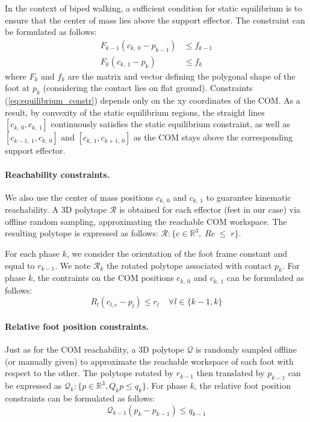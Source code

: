 In the context of biped walking, a sufficient condition for static equilibrium is to ensure that the center of mass lies above the support effector.
The constraint can be formulated as follows:
\begin{equation}
    \label{eq:equilibrium_constr}
    \begin{aligned}
        F_{k-1} (c_{k,\:0}-p_{k-1}) &\leq  f_{k-1}\\%
        F_{k} (c_{k,\:1}-p_{k}) &\leq  f_{k}%
    \end{aligned}
\end{equation}
where $F_k$ and $f_k$ are the matrix and vector defining the polygonal shape of the foot at $p_k$ (considering the contact lies on flat ground).
Constraints (\ref{eq:equilibrium_constr}) depends only on the xy coordinates of the COM.
As a result, by convexity of the static equilibrium regions, the straight lines $[c_{k,\:0}, c_{k,\:1}]$ continuously satisfies the static equilibrium
constraint, as well as $[c_{k-1,\:1}, c_{k,\:0}]$ and $[c_{k,\:1}, c_{k+1,\:0}]$ as the COM stays above the corresponding support effector.

\paragraph{Reachability constraints.}
We also use the center of mass positions $c_{k,\:0}$ and $c_{k,\:1}$ to guarantee kinematic reachability.
A 3D polytope $\mathcal{R}$ is obtained for each effector (feet in our case) via offline random sampling, approximating the reachable COM workspace.
The resulting polytope is expressed as follows: $\mathcal{R} : \{c \in \mathbb{R}^3 , \; \! R c \; \leq \; \! r\}$.

For each phase $k$, we consider the orientation of the foot frame constant and equal to $r_{k-1}$.
We note $\mathcal{R}_k$ the rotated polytope associated with contact $p_{k}$.
For phase $k$, the contraints on the COM positions $c_{k,\:0}$ and $c_{k,\:1}$ can be formulated as follows:
\begin{equation}
    R_{l} (c_{l,e} - p_{l}) \leq r_l \;\;\;\; \forall l \in \{k-1,k\}
\end{equation}

\paragraph{Relative foot position constraints.\label{appendix:foot_pos_constr}}
Just as for the COM reachability, a 3D polytope $\mathcal{Q}$ is randomly sampled offline (or manually given) to approximate the reachable workspace of each foot with respect to the other. The polytope rotated by $r_{k-1}$ then translated by $p_{k-1}$ can be expressed as $\mathcal{Q}_k: \{ p \in \mathbb{R}^3, Q_k p \leq q_k \}$.
For phase $k$, the relative foot position constraints can be formulated as follows:
\begin{equation}
    \mathcal{Q}_{k-1} (p_k - p_{k-1}) \leq q_{k-1}
\end{equation}

